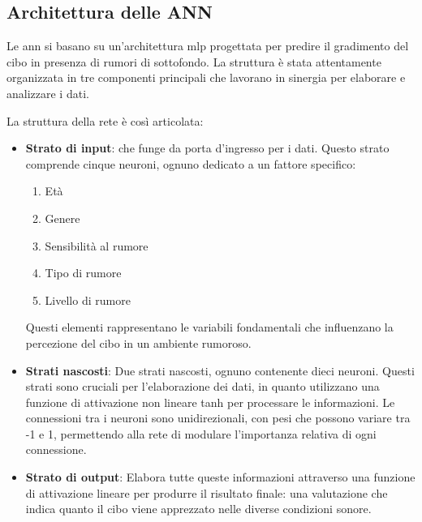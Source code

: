 \subsection{Architettura delle ANN}
\noindent

Le \gls{ann} si basano su un'architettura \gls{mlp} progettata per predire il gradimento del cibo in presenza di rumori di sottofondo. La struttura è stata attentamente organizzata in tre componenti principali che lavorano in sinergia per elaborare e analizzare i dati.

La struttura della rete è così articolata:

\begin{itemize}
    \item \textbf{Strato di input}: che funge da porta d'ingresso per i dati. Questo strato comprende cinque neuroni, ognuno dedicato a un fattore specifico:
    \begin{enumerate}
        \item Età
        \item Genere
        \item Sensibilità al rumore
        \item Tipo di rumore
        \item Livello di rumore
    \end{enumerate}

    Questi elementi rappresentano le variabili fondamentali che influenzano la percezione del cibo in un ambiente rumoroso.
    
    \item \textbf{Strati nascosti}: Due strati nascosti, ognuno contenente dieci neuroni. Questi strati sono cruciali per l'elaborazione dei dati, in quanto utilizzano una funzione di attivazione non lineare \gls{tanh} per processare le informazioni. Le connessioni tra i neuroni sono unidirezionali, con pesi che possono variare tra -1 e 1, permettendo alla rete di modulare l'importanza relativa di ogni connessione.
    
    \item \textbf{Strato di output}: Elabora tutte queste informazioni attraverso una funzione di attivazione lineare per produrre il risultato finale: una valutazione che indica quanto il cibo viene apprezzato nelle diverse condizioni sonore.
\end{itemize}

